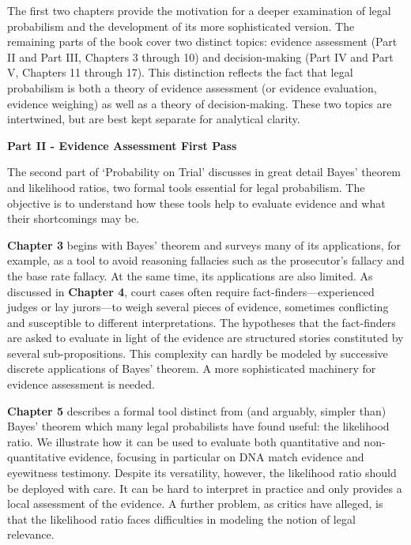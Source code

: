 \documentclass[
  10pt,
  dvipsnames,enabledeprecatedfontcommands]{scrartcl}
\begin{document}
The first two chapters provide the motivation for a deeper examination
of legal probabilism and the development of its more sophisticated
version. The remaining parts of the book cover two distinct topics:
evidence assessment (Part II and Part III, Chapters 3 through 10) and
decision-making (Part IV and Part V, Chapters 11 through 17). This
distinction reflects the fact that legal probabilism is both a theory of
evidence assessment (or evidence evaluation, evidence weighing) as well
as a theory of decision-making. These two topics are intertwined, but
are best kept separate for analytical clarity.

\vspace{3mm}

\noindent \textbf{Part II - Evidence Assessment First Pass}

\noindent The second part of `Probability on Trial' discusses in great
detail Bayes' theorem and likelihood ratios, two formal tools essential
for legal probabilism. The objective is to understand how these tools
help to evaluate evidence and what their shortcomings may be.

\textbf{Chapter 3} begins with Bayes' theorem and surveys many of its
applications, for example, as a tool to avoid reasoning fallacies such
as the prosecutor's fallacy and the base rate fallacy. At the same time,
its applications are also limited. As discussed in \textbf{Chapter 4},
court cases often require fact-finders---experienced judges or lay
jurors---to weigh several pieces of evidence, sometimes conflicting and
susceptible to different interpretations. The hypotheses that the
fact-finders are asked to evaluate in light of the evidence are
structured stories constituted by several sub-propositions. This
complexity can hardly be modeled by successive discrete applications of
Bayes' theorem. A more sophisticated machinery for evidence assessment
is needed.

\textbf{Chapter 5} describes a formal tool distinct from (and arguably,
simpler than) Bayes' theorem which many legal probabilists have found
useful: the likelihood ratio. We illustrate how it can be used to
evaluate both quantitative and non-quantitative evidence, focusing in
particular on DNA match evidence and eyewitness testimony. Despite its
versatility, however, the likelihood ratio should be deployed with care.
It can be hard to interpret in practice and only provides a local
assessment of the evidence. A further problem, as critics have alleged,
is that the likelihood ratio faces difficulties in modeling the notion
of legal relevance.
\end{document}
